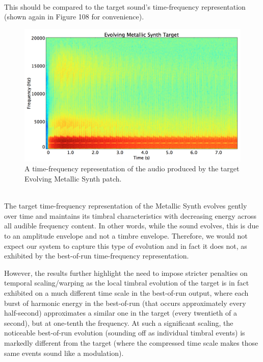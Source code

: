 \documentclass[12pt]{report} 	%
\numberwithin{figure}{chapter}
\numberwithin{table}{chapter}
\numberwithin{equation}{chapter}
\begin{document}
\begin{flushleft}
\begin{figure}[h!]
\end{figure}
\\
This should be compared to the target sound's time-frequency representation (shown again in Figure 108 for convenience).
\begin{figure}[h!]
\begin{center}
\includegraphics[scale=0.35,width=\linewidth]{EvolvingMetallicSynthTargetSTFT}
\caption[Target evolving metallic synth time-frequency representation]{A time-frequency representation of the audio produced by the target Evolving Metallic Synth patch.}
\end{center}
\end{figure}
\\
\clearpage
The target time-frequency representation of the Metallic Synth evolves gently over time and maintains its timbral characteristics with decreasing energy across all audible frequency content. In other words, while the sound evolves, this is due to an amplitude envelope and not a timbre envelope. Therefore, we would not expect our system to capture this type of evolution and in fact it does not, as exhibited by the best-of-run time-frequency representation.

However, the results further highlight the need to impose stricter penalties on temporal scaling/warping as the local timbral evolution of the target is in fact exhibited on a much different time scale in the best-of-run output, where each burst of harmonic energy in the best-of-run (that occurs approximately every half-second) approximates a similar one in the target (every twentieth of a second), but at one-tenth the frequency. At such a significant scaling, the noticeable best-of-run evolution (sounding off as individual timbral events) is markedly different from the target (where the compressed time scale makes those same events sound like a modulation).


\end{flushleft}
\end{document}
